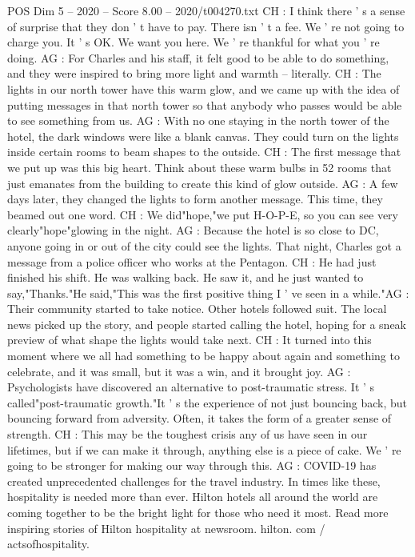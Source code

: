 \begin{textsample}{POS Dim 5 – 2020 – Score 8.00 – 2020/t004270.txt}
CH : I think there ' s a sense of surprise that they don ' t have to pay.
There isn ' t a fee.
We ' re not going to charge you.
It ' s OK.
We want you here.
We ' re thankful for what you ' re doing.
AG : For Charles and his staff, it felt good to be able to do something, and they were inspired to bring more light and warmth -- literally.
CH : The lights in our north tower have this warm glow, and we came up with the idea of putting messages in that north tower so that anybody who passes would be able to see something from us.
AG : With no one staying in the north tower of the hotel, the dark windows were like a blank canvas.
They could turn on the lights inside certain rooms to beam shapes to the outside.
CH : The first message that we put up was this big heart.
Think about these warm bulbs in 52 rooms that just emanates from the building to create this kind of glow outside.
AG : A few days later, they changed the lights to form another message.
This time, they beamed out one word.
CH : We did"hope,"we put H-O-P-E, so you can see very clearly"hope"glowing in the night.
AG : Because the hotel is so close to DC, anyone going in or out of the city could see the lights.
That night, Charles got a message from a police officer who works at the Pentagon.
CH : He had just finished his shift.
He was walking back.
He saw it, and he just wanted to say,"Thanks."He said,"This was the first positive thing I ' ve seen in a while."AG : Their community started to take notice.
Other hotels followed suit.
The local news picked up the story, and people started calling the hotel, hoping for a sneak preview of what shape the lights would take next.
CH : It turned into this moment where we all had something to be happy about again and something to celebrate, and it was small, but it was a win, and it brought joy.
AG : Psychologists have discovered an alternative to post-traumatic stress.
It ' s called"post-traumatic growth."It ' s the experience of not just bouncing back, but bouncing forward from adversity.
Often, it takes the form of a greater sense of strength.
CH : This may be the toughest crisis any of us have seen in our lifetimes, but if we can make it through, anything else is a piece of cake.
We ' re going to be stronger for making our way through this.
AG : COVID-19 has created unprecedented challenges for the travel industry.
In times like these, hospitality is needed more than ever.
Hilton hotels all around the world are coming together to be the bright light for those who need it most.
Read more inspiring stories of Hilton hospitality at newsroom. hilton. com / actsofhospitality.

\end{textsample}
